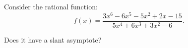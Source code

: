 \documentclass{ximera}
\author{Ivo Terek}
\begin{document}
\begin{exercise}

  Consider the rational function:
$$  f(x) = \frac{3x^6-6x^5-5x^2+2x -15}{5x^4+6x^3+3x^2-6}. $$

  Does it have a slant asymptote?

  \begin{multipleChoice}
  \end{multipleChoice}

\end{exercise}
\end{document}
